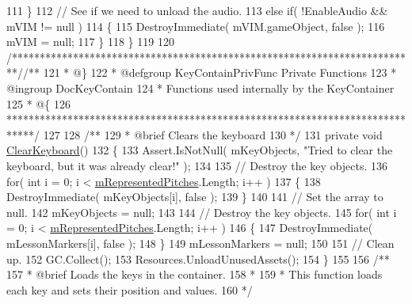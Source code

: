 \begin{DoxyCodeInclude}
111         \}
112         \textcolor{comment}{// See if we need to unload the audio.}
113         \textcolor{keywordflow}{else} \textcolor{keywordflow}{if}( !EnableAudio && mVIM != null )
114         \{
115             DestroyImmediate( mVIM.gameObject, \textcolor{keyword}{false} );
116             mVIM = null;
117         \}
118     \}
119 
120     \textcolor{comment}{/*************************************************************************/}\textcolor{comment}{/** }
121 \textcolor{comment}{    * @\}}
122 \textcolor{comment}{    * @defgroup KeyContainPrivFunc Private Functions}
123 \textcolor{comment}{    * @ingroup DocKeyContain}
124 \textcolor{comment}{    * Functions used internally by the KeyContainer}
125 \textcolor{comment}{    * @\{}
126 \textcolor{comment}{    *****************************************************************************/}
127 \textcolor{comment}{}
128 \textcolor{comment}{    /**}
129 \textcolor{comment}{     * @brief Clears the keyboard}
130 \textcolor{comment}{    */}
131     \textcolor{keyword}{private} \textcolor{keywordtype}{void} \hyperlink{group___key_contain_priv_func_ga679f5ca9d6b1505180e90ee00bbfe616}{ClearKeyboard}()
132     \{
133         Assert.IsNotNull( mKeyObjects, \textcolor{stringliteral}{"Tried to clear the keyboard, but it was already clear!"} );
134 
135         \textcolor{comment}{// Destroy the key objects.}
136         \textcolor{keywordflow}{for}( \textcolor{keywordtype}{int} i = 0; i < \hyperlink{group___key_contain_priv_var_ga103945a6efe3469191e5253d13fec5be}{mRepresentedPitches}.Length; i++ )
137         \{
138             DestroyImmediate( mKeyObjects[i], \textcolor{keyword}{false} );
139         \}
140 
141         \textcolor{comment}{// Set the array to null.}
142         mKeyObjects = null;
143 
144         \textcolor{comment}{// Destroy the key objects.}
145         \textcolor{keywordflow}{for}( \textcolor{keywordtype}{int} i = 0; i < \hyperlink{group___key_contain_priv_var_ga103945a6efe3469191e5253d13fec5be}{mRepresentedPitches}.Length; i++ )
146         \{
147             DestroyImmediate( mLessonMarkers[i], \textcolor{keyword}{false} );
148         \}
149         mLessonMarkers = null;
150 
151         \textcolor{comment}{// Clean up.}
152         GC.Collect();
153         Resources.UnloadUnusedAssets();
154     \}
155 \textcolor{comment}{}
156 \textcolor{comment}{    /**}
157 \textcolor{comment}{     * @brief Loads the keys in the container.}
158 \textcolor{comment}{     * }
159 \textcolor{comment}{     * This function loads each key and sets their position and values.}
160 \textcolor{comment}{    */}

\end{DoxyCodeInclude}
